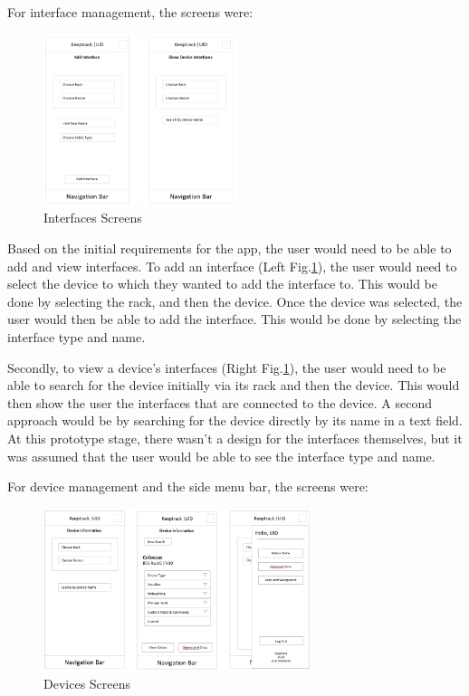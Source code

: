 \documentclass [11pt,a4paper]{article}
\begin{document}
\pagebreak

For interface management, the screens were:
\begin{figure}[H]
    \centering
    \includegraphics[width=0.50\textwidth]{images/initial_prototype_interfaces.png}
    \caption{Interfaces Screens}
    \label{fig:low_fidelity_prototypes_interfaces}
\end{figure}

Based on the initial requirements for the app, the user would need to be able to add and view interfaces. To add an interface (Left Fig.\ref{fig:low_fidelity_prototypes_interfaces}), the user would need to select the device to which they wanted to add the interface to. This would be done by selecting the rack, and then the device. Once the device was selected, the user would then be able to add the interface. This would be done by selecting the interface type and name. 

Secondly, to view a device's interfaces (Right Fig.\ref{fig:low_fidelity_prototypes_interfaces}), the user would need to be able to search for the device initially via its rack and then the device. This would then show the user the interfaces that are connected to the device. A second approach would be by searching for the device directly by its name in a text field. At this prototype stage, there wasn't a design for the interfaces themselves, but it was assumed that the user would be able to see the interface type and name. 

For device management and the side menu bar, the screens were:
\begin{figure}[H]
    \centering
    \includegraphics[width=0.70\textwidth]{images/initial_prototype_devices.png}
    \caption{Devices Screens}
    \label{fig:low_fidelity_prototypes_devices}
\end{figure}
\end{document}
